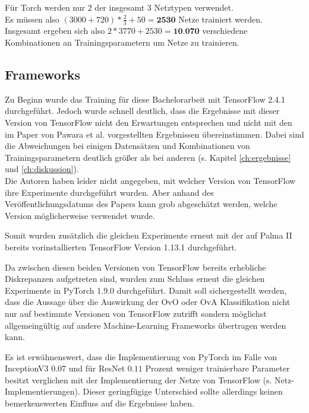 Für Torch \cite{pytorch} werden nur 2 der insgesamt 3 Netztypen verwendet.\\
Es müssen also $(3000 + 720) * \frac{2}{3} + 50 = \textbf{2530}$ Netze trainiert werden.\\

Insgesamt ergeben sich also $2 * 3770 + 2530 = \textbf{10.070}$ verschiedene Kombinationen an Trainingsparametern um Netze zu trainieren.

\subsection{Frameworks}
Zu Beginn wurde das Training für diese Bachelorarbeit mit TensorFlow 2.4.1 \cite{tensorflow} durchgeführt. Jedoch wurde schnell deutlich, dass die Ergebnisse mit dieser Version von TensorFlow \cite{tensorflow} nicht den Erwartungen entsprechen und nicht mit den im Paper von Pawara et al. \cite{pawaraPaper} vorgestellten Ergebnissen übereinstimmen. Dabei sind die Abweichungen bei einigen Datensätzen und Kombinationen von Trainingsparametern deutlich größer als bei anderen (s. Kapitel \ref{ch:ergebnisse} und \ref{ch:diskussion}). \\

Die Autoren haben leider nicht angegeben, mit welcher Version von TensorFlow \cite{tensorflow} ihre Experimente durchgeführt wurden. Aber anhand des\\ Veröffentlichungsdatums des Papers \cite{pawaraPaper} kann grob abgeschätzt werden, welche Version möglicherweise verwendet wurde.

Somit wurden zusätzlich die gleichen Experimente erneut mit der auf Palma II \cite{palma2} bereits vorinstallierten TensorFlow \cite{tensorflow} Version 1.13.1 durchgeführt.

Da zwischen diesen beiden Versionen von TensorFlow \cite{tensorflow} bereits erhebliche Diskrepanzen aufgetreten sind, wurden zum Schluss erneut die gleichen Experimente in PyTorch 1.9.0 \cite{pytorch} durchgeführt.
Damit soll sichergestellt werden, dass die Aussage über die Auswirkung der OvO oder OvA Klassifikation nicht nur auf bestimmte Versionen von TensorFlow \cite{tensorflow} zutrifft sondern möglichst allgemeingültig auf andere Machine-Learning Frameworks übertragen werden kann.

Es ist erwähnenswert, dass die Implementierung von PyTorch \cite{pytorch} im Falle von InceptionV3 $0.07$ und für ResNet $0.11$ Prozent weniger trainierbare Parameter besitzt verglichen mit der Implementierung der Netze von TensorFlow \cite{tensorflow} (s. \cite{githubRepo} Netz-Implementierungen). Dieser geringfügige Unterschied sollte allerdings keinen bemerkenswerten Einfluss auf die Ergebnisse haben.


